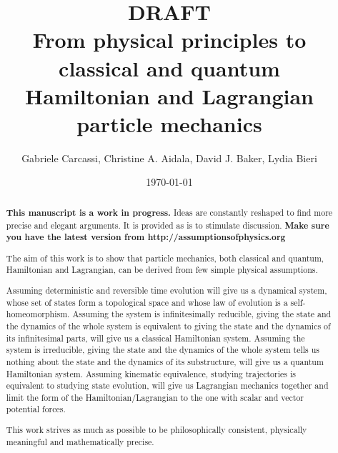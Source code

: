 \documentclass[smallextended]{svjour3}
\numberwithin{equation}{section}
\theoremstyle{definition}
\begin{document}
\title{DRAFT \\ From physical principles to classical and quantum \\ Hamiltonian and Lagrangian particle mechanics}
\author{Gabriele Carcassi, Christine A. Aidala, David J. Baker, Lydia Bieri}

\ifjournal
\else
\fi

\ifjournal
\fi

\date{\today}

\ifjournal
	\maketitle
\fi
	
\begin{abstract}
\textbf{This manuscript is a work in progress.} Ideas are constantly reshaped to find more precise and elegant arguments. It is provided as is to stimulate discussion.  \textbf{Make sure you have the latest version from http://assumptionsofphysics.org}

The aim of this work is to show that particle mechanics, both classical and quantum, Hamiltonian and Lagrangian, can be derived from few simple physical assumptions.

Assuming deterministic and reversible time evolution will give us a dynamical system, whose set of states form a topological space and whose law of evolution is a self-homeomorphism. Assuming the system is infinitesimally reducible, giving the state and the dynamics of the whole system is equivalent to giving the state and the dynamics of its infinitesimal parts, will give us a classical Hamiltonian system. Assuming the system is irreducible, giving the state and the dynamics of the whole system tells us nothing about the state and the dynamics of its substructure, will give us a quantum Hamiltonian system. Assuming kinematic equivalence, studying trajectories is equivalent to studying state evolution, will give us Lagrangian mechanics together and limit the form of the Hamiltonian/Lagrangian to the one with scalar and vector potential forces.

This work strives as much as possible to be philosophically consistent, physically meaningful and mathematically precise.
\end{abstract}
\end{document}
